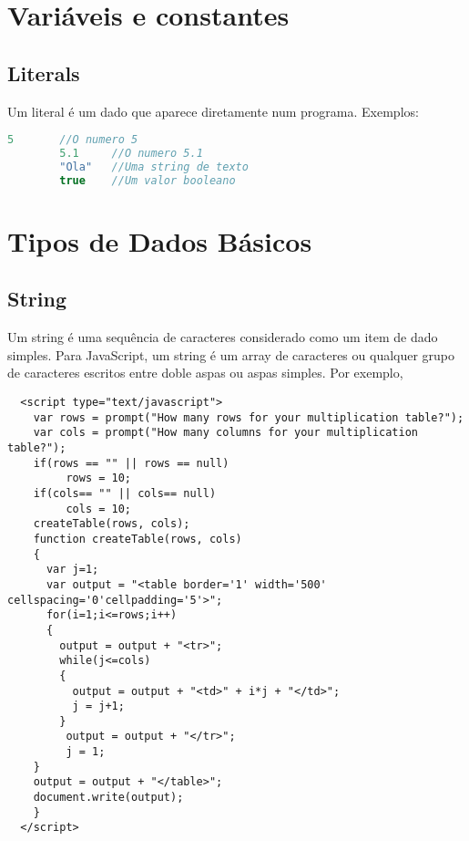     \section{Vari\'{a}veis e constantes}
	\subsection{Literals}
	
	Um literal é um dado que aparece diretamente num programa. Exemplos:
	\begin{lstlisting}[language=JavaScript]
		5	  	//O numero 5
		5.1		//O numero 5.1
		"Ola"	//Uma string de texto
		true	//Um valor booleano
	\end{lstlisting}
    \section{Tipos de Dados B\'{a}sicos}

            \subsection{String}
            Um string \'{e} uma sequ\^{e}ncia de caracteres considerado como um item de dado simples. Para JavaScript, um string \'{e} um array de caracteres ou qualquer grupo de caracteres escritos entre doble aspas ou aspas simples. Por exemplo,
    \begin{lstlisting}
  <script type="text/javascript">
    var rows = prompt("How many rows for your multiplication table?");
    var cols = prompt("How many columns for your multiplication table?");
    if(rows == "" || rows == null)
   		 rows = 10;
    if(cols== "" || cols== null)
   		 cols = 10;
    createTable(rows, cols);
    function createTable(rows, cols)
    {
      var j=1;
      var output = "<table border='1' width='500' cellspacing='0'cellpadding='5'>";
      for(i=1;i<=rows;i++)
      {
    	output = output + "<tr>";
        while(j<=cols)
        {
  		  output = output + "<td>" + i*j + "</td>";
   		  j = j+1;
   		}
   		 output = output + "</tr>";
   		 j = 1;
    }
    output = output + "</table>";
    document.write(output);
    }
  </script>
\end{lstlisting}




